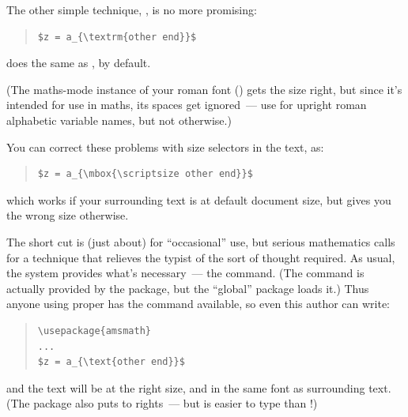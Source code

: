 The other simple technique, , is no more promising:
\begin{quote}
\begin{verbatim}
$z = a_{\textrm{other end}}$
\end{verbatim}
\end{quote}
does the same as , by default.

(The maths-mode instance of your roman font () gets the
size right, but since it's intended for use in maths, its spaces get
ignored~--- use  for upright roman alphabetic variable
names, but not otherwise.)

You can correct these problems with size selectors in the text, as:
\begin{quote}
\begin{verbatim}
$z = a_{\mbox{\scriptsize other end}}$
\end{verbatim}
\end{quote}
which works if your surrounding text is at default document size, but
gives you the wrong size otherwise.

The  short cut is (just about)  for ``occasional''
use, but serious mathematics calls for a technique that
relieves the typist of the sort of thought required.  As usual, the
\AMSLaTeX{} system provides what's necessary~--- the 
command.  (The command is actually provided by the 
package, but the ``global''  package loads it.)  Thus
anyone using \AMSLaTeX{} proper has the command available, so even
this author can write:
\begin{quote}
\begin{verbatim}
\usepackage{amsmath}
...
$z = a_{\text{other end}}$
\end{verbatim}
\end{quote}
and the text will be at the right size, and in the same font as
surrounding text.  (The  package also puts
 to rights~--- but  is easier to type than
!)

